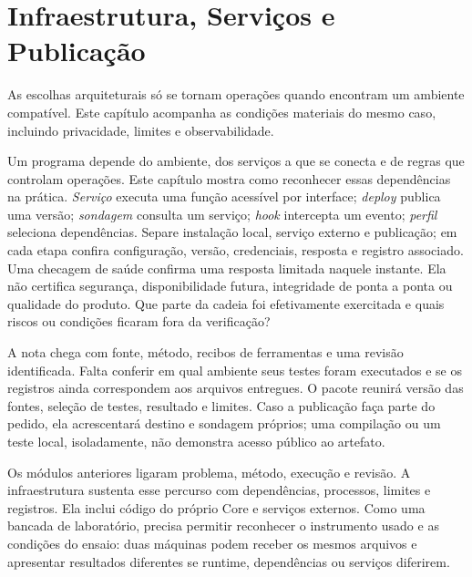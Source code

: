 \chapter{Infraestrutura, Serviços e Publicação}

As escolhas arquiteturais só se tornam operações quando encontram um ambiente compatível. Este capítulo acompanha as condições materiais do mesmo caso, incluindo privacidade, limites e observabilidade.


\roteirodidatico
{Um programa depende do ambiente, dos serviços a que se conecta e de regras que controlam operações. Este capítulo mostra como reconhecer essas dependências na prática.}
{\emph{Serviço} executa uma função acessível por interface; \emph{deploy} publica uma versão; \emph{sondagem} consulta um serviço; \emph{hook} intercepta um evento; \emph{perfil} seleciona dependências.}
{Separe instalação local, serviço externo e publicação; em cada etapa confira configuração, versão, credenciais, resposta e registro associado.}
{Uma checagem de saúde confirma uma resposta limitada naquele instante. Ela não certifica segurança, disponibilidade futura, integridade de ponta a ponta ou qualidade do produto.}
{Que parte da cadeia foi efetivamente exercitada e quais riscos ou condições ficaram fora da verificação?}

{A nota chega com fonte, método, recibos de ferramentas e uma revisão identificada. Falta conferir em qual ambiente seus testes foram executados e se os registros ainda correspondem aos arquivos entregues. O pacote reunirá versão das fontes, seleção de testes, resultado e limites. Caso a publicação faça parte do pedido, ela acrescentará destino e sondagem próprios; uma compilação ou um teste local, isoladamente, não demonstra acesso público ao artefato.}


\begin{descricao}
Os módulos anteriores ligaram problema, método, execução e revisão. A
infraestrutura sustenta esse percurso com dependências, processos, limites e
registros. Ela inclui código do próprio Core e serviços externos. Como uma
bancada de laboratório, precisa permitir reconhecer o instrumento usado e as
condições do ensaio: duas máquinas podem receber os mesmos arquivos e apresentar
resultados diferentes se runtime, dependências ou serviços diferirem.
\end{descricao}


